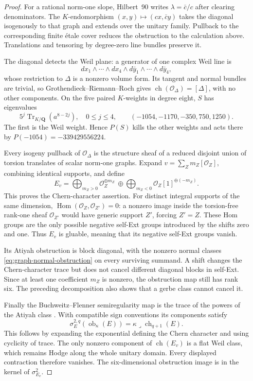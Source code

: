 \documentclass[11pt]{article}
\theoremstyle{definition}
\theoremstyle{remark}
\newcommand{\Q}{\mathbf Q}
\begin{document}
\begin{proof}
For a rational norm-one slope, Hilbert~90 writes $\lambda=\bar c/c$ after clearing denominators. The $K$-endomorphism $(x,y)\mapsto(cx,\bar c y)$ takes the diagonal isogenously to that graph and extends over the unitary family. Pullback to the corresponding finite \'etale cover reduces the obstruction to the calculation above. Translations and tensoring by degree-zero line bundles preserve it.

The diagonal detects the Weil plane: a generator of one complex Weil line is
\[
 dx_1\wedge\cdots\wedge dx_4
 \wedge d\bar y_1\wedge\cdots\wedge d\bar y_4,
\]
whose restriction to $\Delta$ is a nonzero volume form. Its tangent and normal bundles are trivial, so Grothendieck--Riemann--Roch gives $\operatorname{ch}(\mathcal O_\Delta)=[\Delta]$, with no other components. On the five paired $K$-weights in degree eight, $S$ has eigenvalues
\[
 5^j\operatorname{Tr}_{K/\Q}(a^{8-2j}),\quad0\le j\le4,
 \qquad (-1054,-1170,-350,750,1250).
\]
The first is the Weil weight. Hence $P(S)$ kills the other weights and acts there by
$P(-1054)=-339429556224$.

Every isogeny pullback of $\mathcal O_\Delta$ is the structure sheaf of a reduced disjoint union of torsion translates of scalar norm-one graphs. Expand $v=\sum_Zm_Z[\mathcal O_Z]$, combining identical supports, and define
\[
 E_v=\bigoplus_{m_Z>0}\mathcal O_Z^{\oplus m_Z}
 \ \oplus\!
 \bigoplus_{m_Z<0}\mathcal O_Z[1]^{\oplus(-m_Z)}.
\]
This proves the Chern-character assertion. For distinct integral supports of the same dimension, $\operatorname{Hom}(\mathcal O_Z,\mathcal O_{Z'})=0$: a nonzero image inside the torsion-free rank-one sheaf $\mathcal O_{Z'}$ would have generic support $Z'$, forcing $Z'=Z$. These Hom groups are the only possible negative self-Ext groups introduced by the shifts zero and one. Thus $E_v$ is gluable, meaning that its negative self-Ext groups vanish.

Its Atiyah obstruction is block diagonal, with the nonzero normal classes \eqref{eq:graph-normal-obstruction} on every surviving summand. A shift changes the Chern-character trace but does not cancel different diagonal blocks in self-Ext. Since at least one coefficient $m_Z$ is nonzero, the obstruction map still has rank six. The preceding decomposition also shows that a gerbe class cannot cancel it.

Finally the Buchweitz--Flenner semiregularity map is the trace of the powers of the Atiyah class \cite[pp.~136--137]{BF}. With compatible sign conventions its components satisfy
\[
 \sigma_E^{2,q}(\operatorname{ob}_{\kappa}(E))
 =\kappa\mathbin{\lrcorner}\operatorname{ch}_{q+1}(E).
\]
This follows by expanding the exponential defining the Chern character and using cyclicity of trace. The only nonzero component of $\operatorname{ch}(E_v)$ is a flat Weil class, which remains Hodge along the whole unitary domain. Every displayed contraction therefore vanishes. The six-dimensional obstruction image is in the kernel of $\sigma_{E_v}^2$.


\end{proof}
\end{document}
